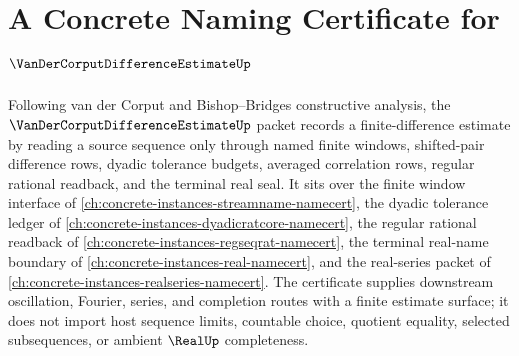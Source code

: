 \chapter{A Concrete Naming Certificate for $\VanDerCorputDifferenceEstimateUp$}
\label{ch:concrete-instances-van-der-corput-difference-estimate-namecert}

Following van der Corput and Bishop--Bridges constructive analysis, the $\VanDerCorputDifferenceEstimateUp$ packet records a finite-difference estimate by reading a source sequence only through named finite windows, shifted-pair difference rows, dyadic tolerance budgets, averaged correlation rows, regular rational readback, and the terminal real seal. It sits over the finite window interface of \autoref{ch:concrete-instances-streamname-namecert}, the dyadic tolerance ledger of \autoref{ch:concrete-instances-dyadicratcore-namecert}, the regular rational readback of \autoref{ch:concrete-instances-regseqrat-namecert}, the terminal real-name boundary of \autoref{ch:concrete-instances-real-namecert}, and the real-series packet of \autoref{ch:concrete-instances-realseries-namecert}. The certificate supplies downstream oscillation, Fourier, series, and completion routes with a finite estimate surface; it does not import host sequence limits, countable choice, quotient equality, selected subsequences, or ambient $\RealUp$ completeness.


